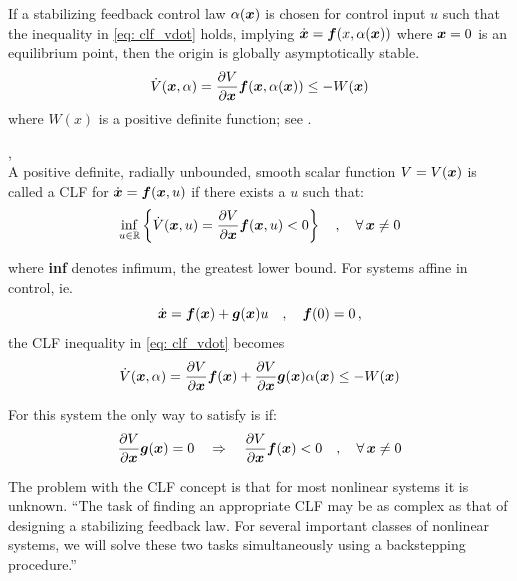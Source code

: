 \documentclass[12pt]{ucthesis}
\begin{document}
If a stabilizing feedback control law $\alpha(\boldsymbol{x})$ is chosen for control input $u$ such that the inequality in \autoref{eq: clf_vdot} holds, implying $\dot{\boldsymbol{x}}=\boldsymbol{f}(x,\alpha(\boldsymbol{x}))$ where $\boldsymbol{x}=0$ is an equilibrium point, then the origin is globally asymptotically stable.
%
	\begin{equation}
		\dot{V}(\boldsymbol{x},\alpha)= \frac{\partial V}{\partial\boldsymbol{x}} \boldsymbol{f}(\boldsymbol{x},\alpha(\boldsymbol{x})) \leq -W(\boldsymbol{x})
		\label{eq: clf_vdot}
	\end{equation} 
where $W(x)$ is a positive definite function; see \citet[Sec. 2.1.2]{Krstic95}.

\begin{defn} \alignright \citet[Def. 2.4]{Krstic95},\citep{Harkegard2003}\\
A positive definite, radially unbounded, smooth scalar function $V = V(\boldsymbol{x})$ is called a CLF for $\dot{\boldsymbol{x}}=\boldsymbol{f}(\boldsymbol{x},u)$ if there exists a $u$ such that: \label{defn: clf}
	\begin{equation}
		\label{eq: clf_def} \inf_{u \in \mathbb{R}} \left\lbrace \dot{V}(\boldsymbol{x},u) = \frac{\partial V}{\partial\boldsymbol{x}} \boldsymbol{f}(\boldsymbol{x},u) < 0 \right\rbrace \quad,\quad \forall \, \boldsymbol{x} \neq 0
	\end{equation}
\end{defn}
%
\noindent where \textbf{inf} denotes infimum, the greatest lower bound. For systems affine in control, ie.
%
	\begin{equation}
		\dot{\boldsymbol{x}}=\boldsymbol{f}(\boldsymbol{x})+\boldsymbol{g}(\boldsymbol{x})u \quad,\quad \boldsymbol{f}(0)=0\,,
		\label{eq: clf_f_affine}
	\end{equation}
the CLF inequality in \autoref{eq: clf_vdot} becomes
%
	\begin{equation}
		\dot{V}(\boldsymbol{x},\alpha)= \frac{\partial V}{\partial\boldsymbol{x}} \boldsymbol{f}(\boldsymbol{x}) + \frac{\partial V}{\partial\boldsymbol{x}} \boldsymbol{g}(\boldsymbol{x})\alpha(\boldsymbol{x}) \leq -W(\boldsymbol{x})
		\label{eq: clf_vdot_affine}
	\end{equation} 

For this system the only way to satisfy  is if:
$$\frac{\partial V}{\partial\boldsymbol{x}} \boldsymbol{g}(\boldsymbol{x})=0 \quad \Rightarrow \quad \frac{\partial V}{\partial\boldsymbol{x}} \boldsymbol{f}(\boldsymbol{x}) < 0 \quad,\quad \forall \, \boldsymbol{x} \neq 0 $$

The problem with the CLF concept is that for most nonlinear systems it is unknown. ``The task of finding an appropriate CLF may be as complex as that of designing a stabilizing feedback law. For several important classes of nonlinear systems, we will solve these two tasks simultaneously using a backstepping procedure.'' \citet{Krstic95}
\end{document}
